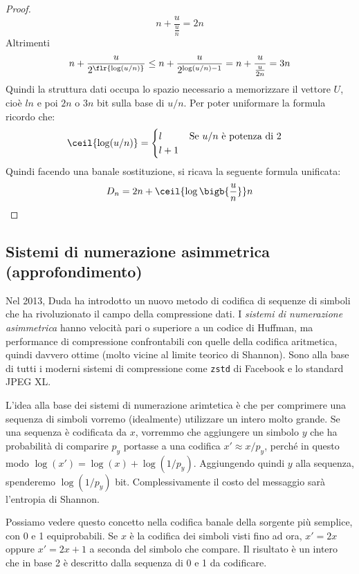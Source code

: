 \begin{proof}
\begin{equation}
		n + \frac{u}{\frac{u}{n}} = 2n
	\end{equation}
	Altrimenti
	\begin{equation}
		n + \frac{u}{2^{\flr{\log(u/n)}}} \leq  n + \frac{u}{2^{\log(u/n) - 1}} = n + \frac{u}{\frac{u}{2n}} = 3n
	\end{equation}
	Quindi la struttura dati occupa lo spazio necessario a memorizzare il vettore $U$, cioè $ln$ e poi $2n$ o $3n$ bit sulla base di $u/n$. Per poter uniformare la formula ricordo che:
	\begin{equation}
		\ceil{\log(u/n)} =
		\begin{cases}
			l \hspace{1cm}\textnormal{Se $u/n$ è potenza di 2} \\
			l + 1
		\end{cases}
	\end{equation}
	Quindi facendo una banale sostituzione, si ricava la seguente formula unificata:
	\begin{equation}
		D_n = 2n + \ceil{\log\bigb{\frac{u}{n}}}n
	\end{equation}
\end{proof}
\subsection{Sistemi di numerazione asimmetrica (approfondimento)}
Nel 2013, Duda \cite{duda} ha introdotto un nuovo metodo di codifica di sequenze di simboli che ha rivoluzionato il campo della compressione dati. I \textit{sistemi di numerazione asimmetrica} hanno velocità pari o superiore a un codice di Huffman, ma performance di compressione confrontabili con quelle della codifica aritmetica, quindi davvero ottime (molto vicine al limite teorico di Shannon). Sono alla base di tutti i moderni sistemi di compressione come \texttt{zstd} di Facebook e lo standard JPEG XL.

L'idea alla base dei sistemi di numerazione arimtetica è che per comprimere una sequenza di simboli vorremo (idealmente) utilizzare un intero molto grande. Se una sequenza è codificata da $x$, vorremmo che aggiungere un simbolo $y$ che ha probabilità di comparire $p_y$ portasse a una codifica $x' \approx x / p_y$, perché in questo modo $\log(x') = \log(x) + \log(1 / p_y)$. Aggiungendo quindi $y$ alla sequenza, spenderemo $\log(1 / p_y)$ bit. Complessivamente il costo del messaggio sarà l'entropia di Shannon.

Possiamo vedere questo concetto nella codifica banale della sorgente più semplice, con 0 e 1 equiprobabili. Se $x$ è la codifica dei simboli visti fino ad ora, $x' = 2x$ oppure $x' = 2x + 1$ a seconda del simbolo che compare. Il risultato è un intero che in base 2 è descritto dalla sequenza di 0 e 1 da codificare.

